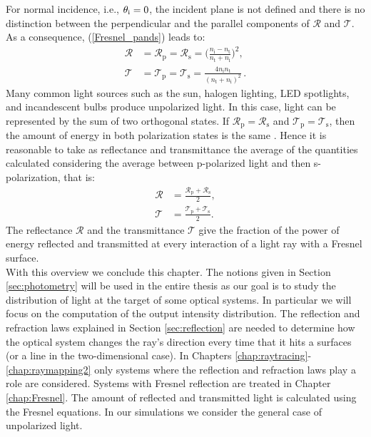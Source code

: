 For normal incidence, i.e., $\theta_\textrm{i} = 0$, the incident plane is not defined and there is no distinction between the perpendicular and the parallel components of $\mathcal{R}$ and $\mathcal{T}$. As a consequence, (\ref{Fresnel_pands}) leads to:
\begin{equation}\label{eq:fresnel_pands2}
\begin{split}
\mathcal{R} &= \mathcal{R}_\textrm{p} = \mathcal{R}_\textrm{s} = \Bigg(\frac{n_\textrm{i}-n_\textrm{t}}{n_\textrm{t}+n_\textrm{i}}\Bigg)^2, \\
\mathcal{T} &= \mathcal{T}_\textrm{p} = \mathcal{T}_\textrm{s} = \frac{4n_\textrm{i} n_\textrm{t}}{(n_\textrm{t}+n_\textrm{i})^2}\,.
\end{split}
\end{equation}
\indent %
Many common light sources such as the sun, halogen lighting, LED spotlights, and incandescent bulbs produce unpolarized light. 
In this case, light can be represented by the sum of two orthogonal states. If $\mathcal{R}_\textrm{p} = \mathcal{R}_\textrm{s}$ and $\mathcal{T}_\textrm{p} = \mathcal{T}_\textrm{s}$, then the amount of energy in both polarization states is the same \cite{hecht1998hecht}.
Hence it is reasonable to take as reflectance and transmittance the average of the quantities calculated considering the average between p-polarized light and then s-polarization, that is:
\begin{equation}\begin{split}
\mathcal{R} &= \frac{\mathcal{R}_\textrm{p}+ \mathcal{R}_\textrm{s}}{2},\\
\mathcal{T} &= \frac{\mathcal{T}_\textrm{p}+ \mathcal{T}_\textrm{s}}{2}.
\end{split}
\label{eq:RandTin2D}
\end{equation}
The reflectance $\mathcal{R}$ and the transmittance $\mathcal{T}$ give the fraction of the power of energy reflected and transmitted at every interaction of a light ray with a Fresnel surface.
 \\
\indent With this overview we conclude this chapter. The notions given in Section \ref{sec:photometry} will be used in the entire thesis as our goal is to study the distribution of light at the target of some optical systems. In particular we will focus on the computation of the output intensity distribution. The reflection and refraction laws explained in Section \ref{sec:reflection} are needed to determine how the optical system changes the ray's direction every time that it hits a surfaces (or a line in the two-dimensional case). In Chapters \ref{chap:raytracing}-\ref{chap:raymapping2} only systems where the reflection and refraction laws play a role are considered. Systems with Fresnel reflection are treated in Chapter \ref{chap:Fresnel}. The amount of reflected and transmitted light is calculated using the Fresnel equations. In our simulations we consider the general case of unpolarized light. 
